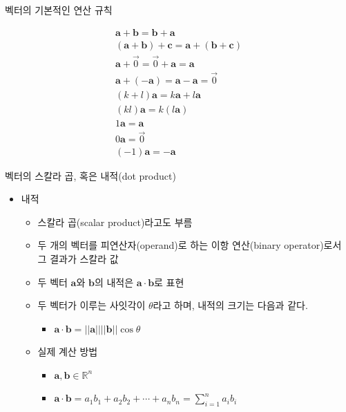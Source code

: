 \begin{frame}{벡터의 기본적인 연산 규칙}

\begin{eqnarray}
\mathbf a + \mathbf b = \mathbf b + \mathbf a \nonumber \\
(\mathbf a + \mathbf b) + \mathbf c = \mathbf a + (\mathbf b + \mathbf c) \nonumber \\
\mathbf a + \vec{0} = \vec{0} + \mathbf a = \mathbf a \nonumber \\
\mathbf a + (- \mathbf a) = \mathbf a - \mathbf a = \vec{0} \nonumber \\
(k+l) \mathbf a = k \mathbf a + l \mathbf a \nonumber \\
(kl) \mathbf a = k (l \mathbf a) \nonumber \\
1 \mathbf a = \mathbf a \nonumber \\
0 \mathbf a = \vec{0} \nonumber \\
(-1) \mathbf a = - \mathbf a \nonumber
\end{eqnarray}
\end{frame}

\begin{frame}{벡터의 스칼라 곱, 혹은 내적(dot product)}
\begin{itemize}
\item 내적
	\begin{itemize}
	\item 스칼라 곱(scalar product)라고도 부름 
	\item 두 개의 벡터를 피연산자(operand)로 하는 이항 연산(binary operator)로서 그 결과가 스칼라 값
	\item 두 벡터 $\mathbf a$와 $\mathbf b$의 내적은 $\mathbf a \cdot \mathbf b$로 표현
	\item 두 벡터가 이루는 사잇각이 $\theta$라고 하며, 내적의 크기는 다음과 같다.
		\begin{itemize}
		\item $\mathbf a \cdot \mathbf b = || \mathbf a || ||\mathbf b || \cos \theta$
		\end{itemize}
	\item 실제 계산 방법
		\begin{itemize}
		\item $\mathbf a , \mathbf b \in \mathbb R^n $
		\item $\mathbf a \cdot \mathbf b = a_1 b_1 + a_2 b_2 + \cdots + a_n b_n = \sum_{i=1}^n a_i b_i $
		\end{itemize}
	\end{itemize}
\end{itemize}

\end{frame}

